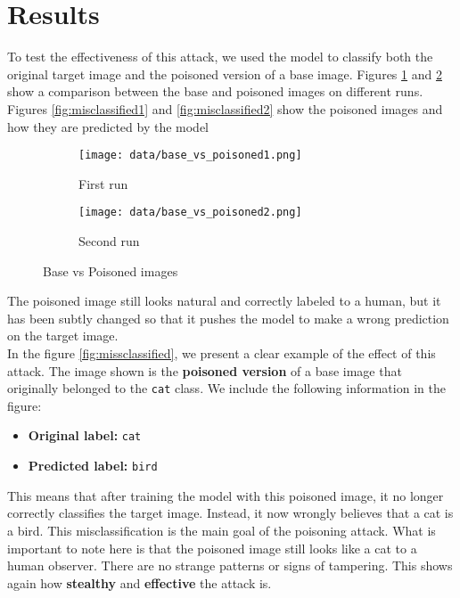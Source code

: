 \section{Results}
To test the effectiveness of this attack, we used the model to classify both the original target image and the poisoned version of a base image.
Figures \ref{fig:poisoned1} and \ref{fig:poisoned2} show a comparison between the base and poisoned images on different runs.
Figures \ref{fig:misclassified1} and \ref{fig:misclassified2} show the poisoned images and how they are predicted by the model

\begin{figure}[htbp]
    \centering
    \begin{subfigure}[b]{0.45\textwidth}
        \texttt{[image: data/base\_vs\_poisoned1.png]}
        \caption{First run}
        \label{fig:poisoned1}
    \end{subfigure}
    \hfill
    \begin{subfigure}[b]{0.45\textwidth}
        \texttt{[image: data/base\_vs\_poisoned2.png]}
        \caption{Second run}
        \label{fig:poisoned2}
    \end{subfigure}
    \caption{Base vs Poisoned images}
    \label{fig:base_vs_poisoned}
\end{figure}
The poisoned image still looks natural and correctly labeled to a human, but it has been subtly changed so that it pushes the model to make a wrong prediction on the target image.\\
In the figure \ref{fig:missclassified}, we present a clear example of the effect of this attack. The image shown is the \textbf{poisoned version} of a base image that originally belonged to the \texttt{cat} class.
We include the following information in the figure:
\begin{itemize}
    \item \textbf{Original label:} \texttt{cat}
    \item \textbf{Predicted label:} \texttt{bird}
\end{itemize}
This means that after training the model with this poisoned image, it no longer correctly classifies the target image. Instead, it now wrongly believes that a cat is a bird. This misclassification is the main goal of the poisoning attack.
What is important to note here is that the poisoned image still looks like a cat to a human observer. There are no strange patterns or signs of tampering. This shows again how \textbf{stealthy} and \textbf{effective} the attack is.
